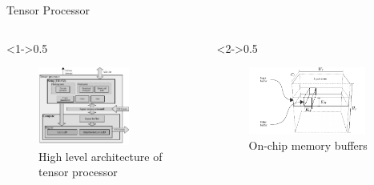 \begin{frame}{Tensor Processor}
	\begin{columns}[c] %
		
		\begin{column}<1->{0.5\textwidth}
			\begin{figure}
				\includegraphics[width=0.7\textwidth]{../chapters/cnn_accelerator/figures/accelerator.pdf} %
				\caption{High level architecture of tensor processor}
			\end{figure}
		\end{column}
		
		\begin{column}<2->{0.5\textwidth}
			\begin{figure}
				\includegraphics[width=0.9\textwidth]{../chapters/cnn_accelerator/figures/accelerator_buffers.pdf} %
				\caption{ On-chip memory buffers}
			\end{figure}
		\end{column}
		
	\end{columns}
\end{frame}

